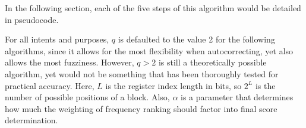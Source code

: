 \documentclass[12pt,a4paper]{article}
\begin{document}
In the following section, each of the five steps of this algorithm would be detailed in pseudocode. \newline

For all intents and purposes, $q$ is defaulted to the value 2 for the following algorithms, since it allows for the most flexibility when autocorrecting, yet also allows the most fuzziness. However, $q > 2$ is still a theoretically possible algorithm, yet would not be something that has been thoroughly tested for practical accuracy. Here, $L$ is the register index length in bits, so $2^L$ is the number of possible positions of a block. Also, $\alpha$ is a parameter that determines how much the weighting of frequency ranking should factor into final score determination. \newline

\end{document}
